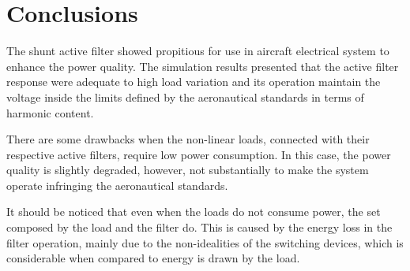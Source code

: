 \section{Conclusions}

The shunt active filter showed propitious for use in aircraft electrical system to enhance the power quality. The simulation results presented that the active filter response were adequate to high load variation and its operation maintain the voltage inside the limits defined by the aeronautical standards in terms of harmonic content.

There are some drawbacks when the non-linear loads, connected with their respective active filters, require low power consumption. In this case, the power quality is slightly degraded, however, not substantially to make the system operate infringing the aeronautical standards.

It should be noticed that even when the loads do not consume power, the set composed by the load and the filter do. This is caused by the energy loss in the filter operation, mainly due to the non-idealities of the switching devices, which is considerable when compared to energy is drawn by the load.

